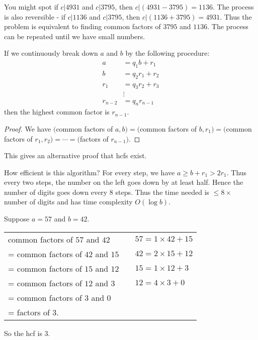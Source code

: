 \documentclass[a4paper]{article}
\begin{document}
You might spot if $c|4931$ and $c|3795$, then $c|(4931 - 3795)=1136$. The process is also reversible - if $c|1136$ and $c|3795$, then $c|(1136 + 3795) = 4931$. Thus the problem is equivalent to finding common factors of $3795$ and $1136$. The process can be repeated until we have small numbers.

\begin{prop}
  If we continuously break down $a$ and $b$ by the following procedure:
  \begin{align*}
    a &= q_1b + r_1\\
    b &= q_2r_1 + r_2\\
    r_1 &= q_3r_2 + r_3\\
    &\vdots\\
    r_{n-2} &= q_nr_{n-1}
  \end{align*}
  then the highest common factor is $r_{n-1}$.
\end{prop}

\begin{proof}
  We have $($common factors of $a, b)=($common factors of $b, r_1)=($common factors of $r_1, r_2 )= \cdots = ($factors of $r_{n-1})$.
\end{proof}
This gives an alternative proof that hcfs exist.

How efficient is this algorithm? For every step, we have $a\geq b + r_1 > 2r_1$. Thus every two steps, the number on the left goes down by at least half. Hence the number of digits goes down every 8 steps. Thus the time needed is $\leq 8\times$ number of digits and has time complexity $O(\log b)$.

\begin{eg}
  Suppose $a = 57$ and $b = 42$.
  \begin{center}
    \begin{tabular}{l l l}
      common factors of $57$ and $42$   &  & $57 = 1\times 42 + 15$ \\
      = common factors of $42$ and $15$ &  & $42 = 2\times 15 + 12$ \\
      = common factors of $15$ and $12$ &  & $15 = 1\times 12 + 3$  \\
      = common factors of $12$ and $3$  &  & $12 = 4\times 3 + 0$   \\
      = common factors of $3$ and $0$                               \\
      = factors of $3$.
    \end{tabular}
  \end{center}
  So the hcf is $3$.
\end{eg}
\end{document}
